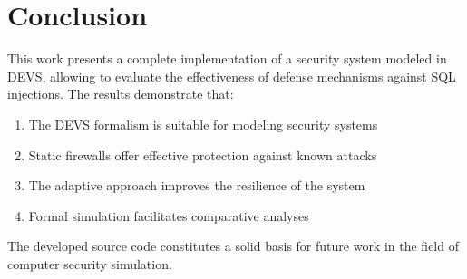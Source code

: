 \documentclass{article}
\begin{document}
\section{Conclusion}
This work presents a complete implementation of a security system modeled in DEVS, allowing to evaluate the effectiveness of defense mechanisms against SQL injections. The results demonstrate that:
\begin{enumerate}
    \item The DEVS formalism is suitable for modeling security systems
    \item Static firewalls offer effective protection against known attacks
    \item The adaptive approach improves the resilience of the system
    \item Formal simulation facilitates comparative analyses
\end{enumerate}

The developed source code constitutes a solid basis for future work in the field of computer security simulation.



\end{document}
